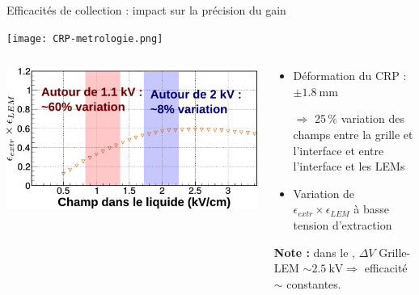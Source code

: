     \begin{frame}{Efficacités de collection : impact sur la précision du gain}
        \begin{center} \vspace{-0.5cm}\texttt{[image: CRP-metrologie.png]} \end{center}
        \begin{scriptsize}
            \begin{columns}
                \begin{column}{0.6\textwidth}
                    \centering \includegraphics[width=\textwidth]{./pictures/extr_eff.pdf}
                \end{column}\hfill
                \begin{column}{0.4\textwidth}
                    \begin{itemize}
       					\item Déformation du CRP : $\pm\SI{1.8}{\milli\meter}$
       					\item[$\Rightarrow$]  25\,\% variation des champs entre la grille et l'interface et entre l'interface et les LEMs
       					\item Variation de $\epsilon_{extr}\times\epsilon_{LEM}$ à basse tension d'extraction
       				\end{itemize}
                     \textbf{Note : } dans le \SSS{},  $\Delta V$ Grille-LEM $\sim\SI{2.5}{\kilo\volt}\Rightarrow$ efficacité $\sim$ constantes.
                \end{column}
            \end{columns}
        \end{scriptsize}
    \end{frame}

